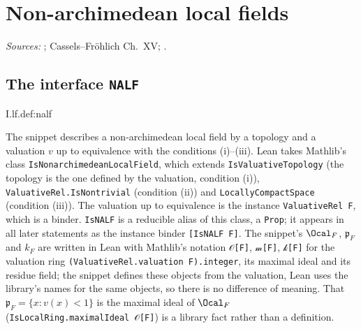 
\chapter{Non-archimedean local fields}\label{ch:ch-0-02-local-field}

\noindent\emph{Sources:} \cite{Corv-ptIII-1}; Cassels--Fr\"ohlich Ch.~XV; \cite[§1]{Cas-p}.

\section{\texorpdfstring{The interface \texttt{NALF}}{The interface NALF}}
\begin{definition}
\end{definition}
\begin{tfformal}{I.lf.def:nalf}
\begin{tffidelity}
The snippet describes a non-archimedean local field by a topology and a valuation $v$ up to equivalence with the conditions (i)--(iii). Lean takes Mathlib's class \texttt{IsNonarchimedeanLocalField}, which extends \texttt{IsValuativeTopology} (the topology is the one defined by the valuation, condition (i)), \texttt{ValuativeRel.IsNontrivial} (condition (ii)) and \texttt{LocallyCompactSpace} (condition (iii)). The valuation up to equivalence is the instance \texttt{ValuativeRel F}, which is a binder. \texttt{IsNALF} is a reducible alias of this class, a \texttt{Prop}; it appears in all later statements as the instance binder \texttt{[IsNALF F]}. The snippet's $\Ocal_F$, $\mathfrak p_F$ and $k_F$ are written in Lean with Mathlib's notation \texttt{𝒪[F]}, \texttt{𝓂[F]}, \texttt{𝓀[F]} for the valuation ring \texttt{(ValuativeRel.valuation F).integer}, its maximal ideal and its residue field; the snippet defines these objects from the valuation, Lean uses the library's names for the same objects, so there is no difference of meaning. That $\mathfrak p_F=\{x:v(x)<1\}$ is the maximal ideal of $\Ocal_F$ (\texttt{IsLocalRing.maximalIdeal 𝒪[F]}) is a library fact rather than a definition.
\end{tffidelity}
\end{tfformal}

